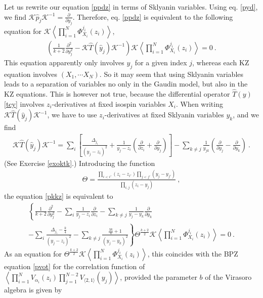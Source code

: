 \documentclass[12pt, a4paper, notitlepage, twoside]{report}
\numberwithin{equation}{section}
\theoremstyle{break}
\begin{document}
Let us rewrite our equation \eqref{ppdz} in terms of Sklyanin variables.
Using eq. \eqref{pyd}, we find
$\mathcal{K} \hat{p}_j \mathcal{K}^{-1}= {\frac{\partial}{\partial y_j}} $.
Therefore,  
eq. \eqref{ppdz} is equivalent to the following equation for $\mathcal{K}\left\langle \prod_{i=1}^N \Phi^{j_i}_{X_i}(z_i)\right\rangle$,
\begin{align}
 \left(\frac{1}{k+2}\frac{\partial ^2}{\partial y_j^2} - \mathcal{K} \hat{T}(\hat{y}_j) \mathcal{K}^{-1}\right)\mathcal{K}\left\langle \prod_{i=1}^N \Phi^{j_i}_{X_i}(z_i)\right\rangle  = 0\ .
\label{pkkz}
\end{align}
This equation apparently only involves $y_j$ for a given index $j$, whereas each KZ equation involves $(X_1,\cdots X_N)$. 
So it may seem that using Sklyanin variables leads to a separation of variables no only in the Gaudin model, but also
in the KZ equations. 
This is however not true, because the differential operator $\hat{T}(y)$ \eqref{tcy} involves $z_i$-derivatives at fixed isospin variables $X_i$.
When writing $\mathcal{K} \hat{T}(\hat{y}_j) \mathcal{K}^{-1}$, we have to use $z_i$-derivatives at fixed Sklyanin variables $y_k$, and we find
\begin{align}
\mathcal{K} \hat{T}(\hat{y}_j) \mathcal{K}^{-1} = \sum_i\left[\frac{\Delta_{j_i}}{(y_j-z_i)^2}+ \frac{1}{y_j-z_i}\left({\frac{\partial}{\partial z_i}}+{\frac{\partial}{\partial y_j}}\right)\right]-\sum_{k\neq j}\frac{1}{y_{jk}}\left({\frac{\partial}{\partial y_j}}-{\frac{\partial}{\partial y_k}}\right)\ .
\label{dtyj}
\end{align}
(See Exercise \ref{exoktk}.) 
Introducing the function
\begin{align}
 \Theta = \frac{\prod_{i<i'}(z_i-z_{i'})\prod_{j<j'}(y_j-y_{j'})}{\prod_{i,j}(z_i-y_j)}\ ,
\end{align}
the equation \eqref{pkkz} is equivalent to 
\begin{multline}
 \left\{\frac{1}{k+2}  \frac{\partial^2}{\partial y_j^2} - \sum_i\frac{1}{y_j-z_i}{\frac{\partial}{\partial z_i}} -\sum_{k\neq j}\frac{1}{y_j-y_k} {\frac{\partial}{\partial y_k}}
\right. \\ \left.
 -\sum_i\frac{\Delta_{j_i}-\frac{k}{4}}{(y_j-z_i)^2}  -\sum_{k\neq j}\frac{\frac{3k}{4}+1}{(y_j-y_k)^2}   \right\} \Theta^{\frac{k+2}{2}}\mathcal{K}\left\langle \prod_{i=1}^N \Phi^{j_i}_{X_i}(z_i)\right\rangle = 0\ .
\end{multline}
As an equation for $\Theta^{\frac{k+2}{2}}\mathcal{K}\left\langle \prod_{i=1}^N \Phi^{j_i}_{X_i}(z_i)\right\rangle$,
this coincides with the BPZ equation \eqref{pvot} for the correlation function of $\left\langle \prod_{i=1}^N V_{\alpha_i}(z_i) \prod_{j=1}^{N-2}V_{\langle 2,1\rangle}(y_j)\right\rangle$, provided the parameter $b$ of the Virasoro algebra is given by 
\end{document}
